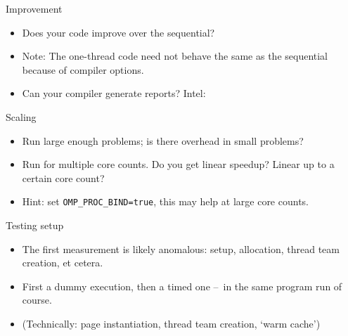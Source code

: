 

\begin{numberedframe}{Improvement}
\begin{itemize}
\item Does your code improve over the sequential?
\item Note: The one-thread code need not behave the same
  as the sequential because of compiler options.
\item Can your compiler generate reports? Intel: 
\end{itemize}
\end{numberedframe}

\begin{numberedframe}{Scaling}
\begin{itemize}
\item Run large enough problems; is there overhead in small problems?
\item Run for multiple core counts. Do you get linear speedup? Linear
  up to a certain core count?
\item Hint: set \lstinline{OMP_PROC_BIND=true}, this may help
  at large core counts.
\end{itemize}
\end{numberedframe}

\begin{numberedframe}{Testing setup}
\begin{itemize}
\item The first measurement is likely anomalous: setup, allocation,
  thread team creation, et cetera.
\item First a dummy execution, then a timed one --~in the same program run of course.
\item (Technically: page instantiation, thread team creation, `warm cache')
\end{itemize}
\end{numberedframe}

\endinput

\begin{numberedframe}{}
\begin{lstlisting}
\end{lstlisting}
\begin{itemize}
\item
\end{itemize}
\end{numberedframe}

